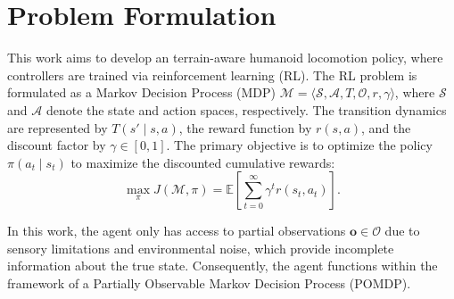\section{Problem Formulation}

This work aims to develop an terrain-aware humanoid locomotion policy, where controllers are trained via reinforcement learning (RL). The RL problem is formulated as a Markov Decision Process (MDP) $\mathcal{M} = \langle \mathcal{S}, \mathcal{A}, T, \mathcal{O}, r, \gamma \rangle$, where $\mathcal{S}$ and $\mathcal{A}$ denote the state and action spaces, respectively. The transition dynamics are represented by $T(s' \mid\! s, a)$, the reward function by $r(s, a)$, and the discount factor by $\gamma \in [0, 1]$. The primary objective is to optimize the policy $\pi(a_t \mid s_t)$ to maximize the discounted cumulative rewards: \begin{equation} \max_\pi J(\mathcal{M}, \pi) = \mathbb{E}\left[ \sum_{t=0}^\infty \gamma^t r(s_t, a_t)\right]. \end{equation}

In this work, the agent only has access to partial observations $\mathbf{o} \in \mathcal{O}$ due to sensory limitations and environmental noise, which provide incomplete information about the true state. Consequently, the agent functions within the framework of a Partially Observable Markov Decision Process (POMDP).
